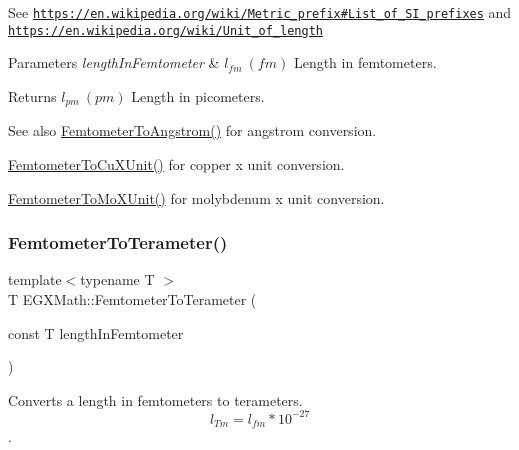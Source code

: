 See \href{https://en.wikipedia.org/wiki/Metric_prefix#List_of_SI_prefixes}{\tt https\+://en.\+wikipedia.\+org/wiki/\+Metric\+\_\+prefix\#\+List\+\_\+of\+\_\+\+S\+I\+\_\+prefixes} and \href{https://en.wikipedia.org/wiki/Unit_of_length}{\tt https\+://en.\+wikipedia.\+org/wiki/\+Unit\+\_\+of\+\_\+length} 
\begin{DoxyParams}{Parameters}
{\em length\+In\+Femtometer} & $ l_{fm}\ (fm)$ Length in femtometers. \\
\hline
\end{DoxyParams}
\begin{DoxyReturn}{Returns}
$ l_{pm}\ (pm)$ Length in picometers. 
\end{DoxyReturn}
\begin{DoxySeeAlso}{See also}
\mbox{\hyperlink{group___e_g_x_math-_conversions-_length_conversions-_femtometer-_non-_s_i_ga72862654ebe3812db0fbf8d11d7059ff}{Femtometer\+To\+Angstrom()}} for angstrom conversion. 

\mbox{\hyperlink{group___e_g_x_math-_conversions-_length_conversions-_femtometer-_non-_s_i_ga59bde341fe80506851e39cd2ceb3747b}{Femtometer\+To\+Cu\+X\+Unit()}} for copper x unit conversion. 

\mbox{\hyperlink{group___e_g_x_math-_conversions-_length_conversions-_femtometer-_non-_s_i_ga57801d7c681362c1a11053233e31c415}{Femtometer\+To\+Mo\+X\+Unit()}} for molybdenum x unit conversion. 
\end{DoxySeeAlso}
\mbox{\label{group___e_g_x_math-_conversions-_length_conversions-_femtometer-_s_i_ga9b76ed4edddb239375ea2ec8eb1cbc11}} 
\subsubsection{\texorpdfstring{Femtometer\+To\+Terameter()}{FemtometerToTerameter()}}
{\footnotesize\ttfamily template$<$typename T $>$ \\
T E\+G\+X\+Math\+::\+Femtometer\+To\+Terameter (\begin{DoxyParamCaption}\item[{const T}]{length\+In\+Femtometer }\end{DoxyParamCaption})}



Converts a length in femtometers to terameters. \[ l_{Tm}=l_{fm} * 10^{-27} \]. 

